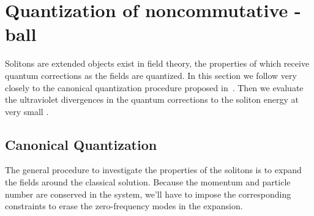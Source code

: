 \documentclass[a4paper,a4paper]{article}
\begin{document}
\section{Quantization of noncommutative \coordHE{}-ball}

Solitons are extended objects exist in field theory, the properties of which receive 
quantum corrections as the fields are quantized. In this section 
we follow very closely to the canonical quantization procedure 
proposed in~\cite{ChristLee,LeeReport}. 
Then we evaluate the ultraviolet divergences in the quantum corrections to 
the soliton energy at very small \myHighlight{$\theta$}\coordHE{} . 

\subsection{Canonical Quantization}

The general procedure to investigate the properties of the solitons is
to expand the fields around the classical solution. Because the momentum
and particle number are conserved in the system, we'll 
have to impose the corresponding constraints to erase the zero-frequency 
modes in the expansion. 
\end{document}

